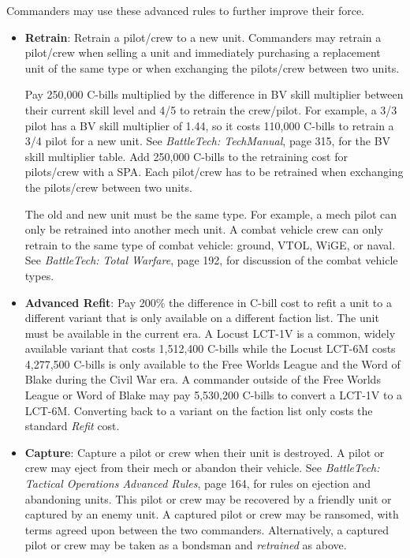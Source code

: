 \documentclass{article}
\begin{document}
Commanders may use these advanced rules to further improve their force.

\begin{itemize}

\item {\bfseries Retrain}: Retrain a pilot/crew to a new unit.
Commanders may retrain a pilot/crew when selling a unit and immediately purchasing a replacement unit of the same type or when exchanging the pilots/crew between two units.

Pay 250,000 C-bills multiplied by the difference in BV skill multiplier between their current skill level and 4/5 to retrain the crew/pilot.
For example, a 3/3 pilot has a BV skill multiplier of 1.44, so it costs 110,000 C-bills to retrain a 3/4 pilot for a new unit.
See \emph{BattleTech: TechManual}, page 315, for the BV skill multiplier table.
Add 250,000 C-bills to the retraining cost for pilots/crew with a SPA.
Each pilot/crew has to be retrained when exchanging the pilots/crew between two units.

The old and new unit must be the same type.
For example, a mech pilot can only be retrained into another mech unit.
A combat vehicle crew can only retrain to the same type of combat vehicle: ground, VTOL, WiGE, or naval.
See \emph{BattleTech: Total Warfare}, page 192, for discussion of the combat vehicle types.

\item {\bfseries Advanced Refit}: Pay 200\% the difference in C-bill cost to refit a unit to a different variant that is only available on a different faction list.
The unit must be available in the current era.
A Locust LCT-1V is a common, widely available variant that costs 1,512,400 C-bills while the Locust LCT-6M costs 4,277,500 C-bills is only available to the Free Worlds League and the Word of Blake during the Civil War era.
A commander outside of the Free Worlds League or Word of Blake may pay 5,530,200 C-bills to convert a LCT-1V to a LCT-6M.
Converting back to a variant on the faction list only costs the standard \emph{Refit} cost.

\item {\bfseries Capture}: Capture a pilot or crew when their unit is destroyed.
A pilot or crew may eject from their mech or abandon their vehicle.
See \emph{BattleTech: Tactical Operations Advanced Rules}, page 164, for rules on ejection and abandoning units.
This pilot or crew may be recovered by a friendly unit or captured by an enemy unit.
A captured pilot or crew may be ransomed, with terms agreed upon between the two commanders.
Alternatively, a captured pilot or crew may be taken as a bondsman and \emph{retrained} as above.


\end{itemize}
\end{document}
